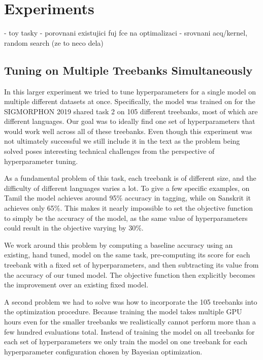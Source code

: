 \chapter{Experiments}
\label{chapter:experiments}


- toy tasky
  - porovnani existujici fuj fce na optimalizaci
  - srovnani acq/kernel, random search (ze to neco dela)

\section{Tuning on Multiple Treebanks Simultaneously}
\label{section:multiple-treebanks-failed}

In this larger experiment we tried to tune hyperparameters for a single model on multiple different datasets at once. Specifically, the model was trained on for the SIGMORPHON 2019 shared task 2 \citep{sigmorphon2019task2} on 105 different treebanks, most of which are different languages. Our goal was to ideally find one set of hyperparameters that would work well across all of these treebanks. Even though this experiment was not ultimately successful we still include it in the text as the problem being solved poses interesting technical challenges from the perspective of hyperparameter tuning.

As a fundamental problem of this task, each treebank is of different size, and the difficulty of different languages varies a lot. To give a few specific examples, on Tamil the model achieves around 95\% accuracy in tagging, while on Sanskrit it achieves only 65\%. This makes it nearly impossible to set the objective function to simply be the accuracy of the model, as the same value of hyperparameters could result in the objective varying by 30\%. 

We work around this problem by computing a baseline accuracy using an existing, hand tuned, model on the same task, pre-computing its score for each treebank with a fixed set of hyperparameters, and then subtracting its value from the accuracy of our tuned model. The objective function then explicitly becomes the improvement over an existing fixed model.

A second problem we had to solve was how to incorporate the 105 treebanks into the optimization procedure. Because training the model takes multiple GPU hours even for the smaller treebanks we realistically cannot perform more than a few hundred evaluations total. Instead of training the model on all treebanks for each set of hyperparameters we only train the model on one treebank for each hyperparameter configuration chosen by Bayesian optimization.

